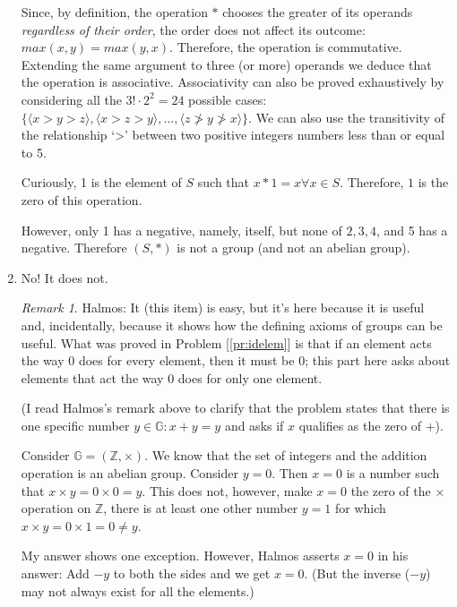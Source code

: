\documentclass[english,notitlepage,smartquotes]{hgbreport}
\theoremstyle{definition}
\theoremstyle{definition}
\theoremstyle{remark}
\newtheorem*{remark}{Remark}
\theoremstyle{definition}
\theoremstyle{plain}
\theoremstyle{definition}
\begin{document}
\begin{enumerate}
Since, by definition, the operation $*$ chooses the greater of its operands \emph{regardless of their order}, the order does not affect its outcome: $max(x,y)=max(y,x)$. Therefore, the operation is commutative. Extending the same argument to three (or more) operands we deduce that the operation is associative. Associativity can also be proved exhaustively by considering all the $3!\cdot 2^2=24$ possible cases: $\{\langle x>y>z\rangle,\langle x>z>y\rangle,\dots,\langle z\ngtr y \ngtr x\rangle\}$. We can also use the transitivity of the relationship `>' between two positive integers numbers less than or equal to 5.

Curiously, 1 is the element of $S$ such that $x*1=x\forall x\in S$. Therefore, $1$ is the zero of this operation.

However, only 1 has a negative, namely, itself, but none of $2,3,4$, and 5 has a negative. Therefore $(S,*)$ is not a group (and not an abelian group).

\item\label{item:xyyx0s} No! It does not.

\begin{remark}
Halmos: It (this item) is easy, but it's here because it is useful and, incidentally, because it shows how the defining axioms of groups can be useful. What was proved in Problem [\ref{pr:idelem}] is that if an element acts the way 0 does for every element, then it must be 0; this part here asks about elements that act the way 0 does for only one element.
\end{remark}
(I read Halmos's remark above to clarify that the problem states that there is one specific number $y\in\mathbb{G}: x+y=y$ and asks if $x$ qualifies as the zero of $+$).

Consider $\mathbb{G}=(\mathbb Z,\times)$. We know that the set of integers and the addition operation is an abelian group. Consider $y=0$. Then $x=0$ is a number such that $x\times y=0\times 0=y$. This does not, however, make $x=0$ the zero of the $\times$ operation on $\mathbb Z$, there is at least one other number $y=1$ for which $x\times y=0\times 1=0\ne y$.

My answer shows one exception. However, Halmos asserts $x=0$ in his answer: Add $-y$ to both the sides and we get $x=0$. (But the inverse ($-y$) may not always exist for all the elements.)
\end{enumerate}
\end{document}
